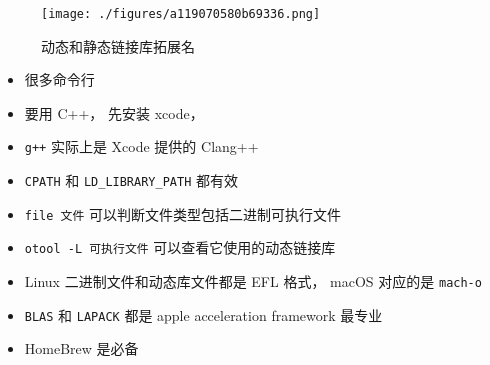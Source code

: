
\begin{issues}
\issueDraft
\end{issues}

\begin{figure}[ht]
\centering
\texttt{[image: ./figures/a119070580b69336.png]}
\caption{动态和静态链接库拓展名} \label{fig_MacDev_1}
\end{figure}

\begin{itemize}
\item 很多命令行
\item 要用 C++， 先安装 xcode， \item \verb`g++` 实际上是 Xcode 提供的 Clang++
\item \verb`CPATH` 和 \verb`LD_LIBRARY_PATH` 都有效
\item \verb`file 文件` 可以判断文件类型包括二进制可执行文件
\item \verb`otool -L 可执行文件` 可以查看它使用的动态链接库
\item Linux 二进制文件和动态库文件都是 EFL 格式， macOS 对应的是 \verb`mach-o`
\item \verb`BLAS` 和 \verb`LAPACK` 都是 apple acceleration framework 最专业
\item HomeBrew 是必备
\end{itemize}

